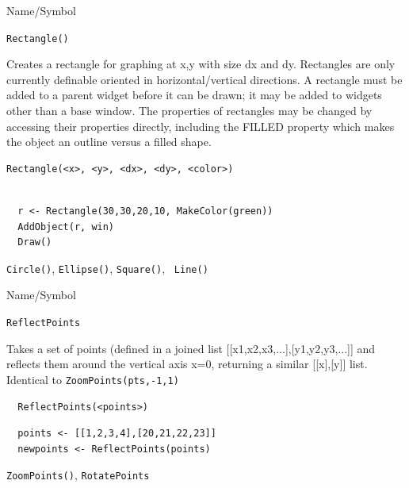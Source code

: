 \begin{desc}{Name/Symbol}
\item[Name/Symbol]	\verb+Rectangle()+
  
\item[Description]	Creates a rectangle for graphing at x,y with size
  dx and dy. Rectangles are only currently definable oriented in
  horizontal/vertical directions.  A rectangle  must be added
  to a parent widget before it can be drawn; it may be added to
  widgets other than a base window.  The properties of rectangles may be
  changed by accessing their properties directly, including the FILLED
  property which makes the object an outline versus a filled shape.

\item[Usage]
\begin{verbatim}
Rectangle(<x>, <y>, <dx>, <dy>, <color>)
\end{verbatim}

\item[Example]	
\begin{verbatim}
  
  r <- Rectangle(30,30,20,10, MakeColor(green))
  AddObject(r, win)
  Draw()

\end{verbatim}
\item[See Also]	 \verb+Circle()+, \verb+Ellipse()+, \verb+Square()+, \verb+ Line()+
\end{desc}

\begin{desc}{Name/Symbol}
\item[Name/Symbol]	\verb+ReflectPoints+

\item[Description]  Takes a set of points (defined in a joined list 
[[x1,x2,x3,...],[y1,y2,y3,...]] and reflects them around the vertical
axis x=0, returning a similar [[x],[y]] list.  Identical to
\verb+ZoomPoints(pts,-1,1)+

\item[Usage]
\begin{verbatim}
  ReflectPoints(<points>)
\end{verbatim}

\item[Example] 
\begin{verbatim}
  points <- [[1,2,3,4],[20,21,22,23]]
  newpoints <- ReflectPoints(points)
\end{verbatim}

\item[See Also] \verb+ZoomPoints()+, \verb+RotatePoints+
\end{desc}



